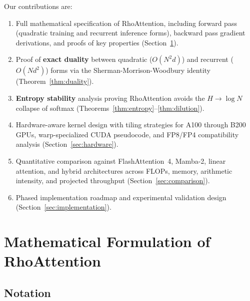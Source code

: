\documentclass[11pt,a4paper]{article}
\theoremstyle{remark}
\begin{document}
Our contributions are:
\begin{enumerate}[leftmargin=*]
    \item Full mathematical specification of RhoAttention, including forward pass (quadratic training and recurrent inference forms), backward pass gradient derivations, and proofs of key properties (Section~\ref{sec:math}).
    \item Proof of \textbf{exact duality} between quadratic ($O(N^2d)$) and recurrent ($O(Nd^2)$) forms via the Sherman-Morrison-Woodbury identity (Theorem~\ref{thm:duality}).
    \item \textbf{Entropy stability} analysis proving RhoAttention avoids the $H \to \log N$ collapse of softmax (Theorems~\ref{thm:entropy}--\ref{thm:dilution}).
    \item Hardware-aware kernel design with tiling strategies for A100 through B200 GPUs, warp-specialized CUDA pseudocode, and FP8/FP4 compatibility analysis (Section~\ref{sec:hardware}).
    \item Quantitative comparison against FlashAttention~4, Mamba-2, linear attention, and hybrid architectures across FLOPs, memory, arithmetic intensity, and projected throughput (Section~\ref{sec:comparison}).
    \item Phased implementation roadmap and experimental validation design (Section~\ref{sec:implementation}).
\end{enumerate}

\section{Mathematical Formulation of RhoAttention}
\label{sec:math}

\subsection{Notation}
\end{document}
